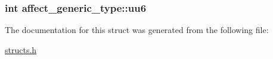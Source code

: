 \hypertarget{structaffect__generic__type_ab8f0e319c3bf6a92853fdce86ee5af68}{
\subsubsection[{uu6}]{\setlength{\rightskip}{0pt plus 5cm}int affect\-\_\-generic\-\_\-type\-::uu6}}\label{structaffect__generic__type_ab8f0e319c3bf6a92853fdce86ee5af68}


The documentation for this struct was generated from the following file\-:\begin{DoxyCompactItemize}
\item 
\hyperlink{structs_8h}{structs.\-h}\end{DoxyCompactItemize}
